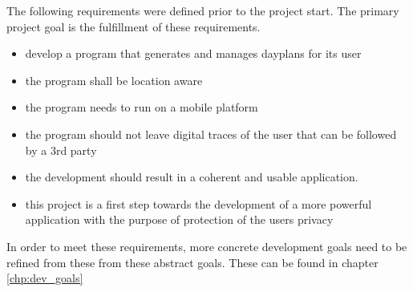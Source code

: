 The following requirements were defined prior to the project start. The primary project goal is the fulfillment of these requirements.
\begin{itemize}
\item develop a program that generates and manages dayplans for its user
\item the program shall be location aware
\item the program needs to run on a mobile platform
\item the program should not leave digital traces of the user that can be followed by a 3rd party
\item the development should result in a coherent and usable application. 
\item this project is a first step towards the development of a more powerful application with the purpose of protection of the users privacy
\end{itemize}
In order to meet these requirements, more concrete development goals need to be refined from these from these abstract goals. These can be found in chapter \ref{chp:dev_goals}  
